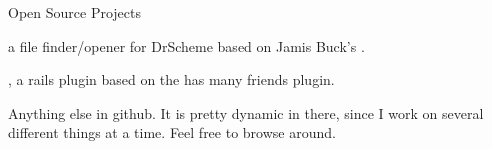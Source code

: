 \begin{rubric}{Open Source Projects}{ 

    \entry* 
        \textbf{} a
        file finder/opener for DrScheme based on Jamis Buck's
        .

    \entry* 
        \textbf{}, a rails
        plugin based on the has many friends plugin. 
        

    \entry*
        Anything else in github. It is pretty dynamic in there, since I work on
        several different things at a time. Feel free to browse around.
        

}\end{rubric}
